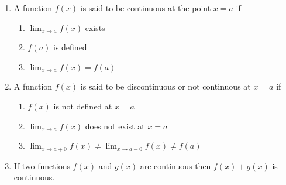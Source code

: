 \documentclass{article}
\begin{document}
\begin{enumerate}
\item A function $f(x)$ is said to be continuous at the point $x=a$ if
\begin{enumerate}
\item $\lim_{x\rightarrow a}f(x)$ exists
\item $f(a)$ is defined
\item $\lim_{x\rightarrow a}f(x)=f(a)$
\end{enumerate}
\item A function $f(x)$ is said to be discontinuous or not continuous at $x=a$ if
\begin{enumerate}
\item $f(x)$ is not defined at $x=a$
\item $\lim_{x\rightarrow a}f(x)$ does not exist at $x=a$
\item $\lim_{x\rightarrow a+0}f(x)\ne \lim_{x\rightarrow a-0}f(x)\ne f(a)$
\end{enumerate}
\item If two functions $f(x)$ and $g(x)$ are continuous then $f(x)+g(x)$ is continuous.

\end{enumerate}
\end{document}
